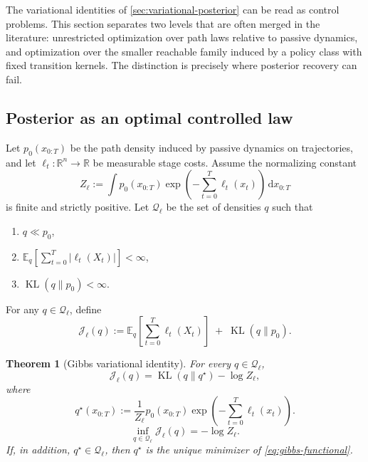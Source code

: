\documentclass[11pt]{article}
\newcommand{\R}{\mathbb{R}}
\newcommand{\E}{\mathbb{E}}
\newcommand{\KL}{\operatorname{KL}}
\newcommand{\dd}{\,\mathrm d}
\newcommand{\xtraj}{x_{0:T}}
\newcommand{\abs}[1]{\left\lvert #1 \right\rvert}
\newcommand{\bracks}[1]{\left[ #1 \right]}
\newcommand{\mc}{\mathcal}
\numberwithin{equation}{section}
\theoremstyle{plain}
\newtheorem{theorem}{Theorem}[section]
\theoremstyle{definition}
\theoremstyle{remark}
\begin{document}
The variational identities of \cref{sec:variational-posterior} can be read as control problems. This section separates two levels that are often merged in the literature: unrestricted optimization over path laws relative to passive dynamics, and optimization over the smaller reachable family induced by a policy class with fixed transition kernels. The distinction is precisely where posterior recovery can fail.

\subsection{Posterior as an optimal controlled law}

Let $p_0(\xtraj)$ be the path density induced by passive dynamics on trajectories, and let $\ell_t:\R^n\to\R$ be measurable stage costs. Assume the normalizing constant
\begin{equation}
Z_\ell := \int p_0(\xtraj)\exp\!\left(-\sum_{t=0}^{T}\ell_t(x_t)\right)\dd \xtraj
\end{equation}
is finite and strictly positive. Let $\mc Q_\ell$ be the set of densities $q$ such that
\begin{enumerate}[label=\roman*.]
\item $q\ll p_0$,
\item $\E_q\!\bracks{\sum_{t=0}^{T}\abs{\ell_t(X_t)}}<\infty$,
\item $\KL(q\|p_0)<\infty$.
\end{enumerate}
For any $q\in\mc Q_\ell$, define
\begin{equation}
\mc J_{\ell}(q)
:=
\E_q\!\bracks{\sum_{t=0}^{T}\ell_t(X_t)}
\;+\;
\KL(q\|p_0).
\label{eq:gibbs-functional}
\end{equation}

\begin{theorem}[Gibbs variational identity]
\label{thm:gibbs-control}
For every $q\in\mc Q_\ell$,
\begin{equation}
\mc J_{\ell}(q)
=
\KL(q\|q^\star)-\log Z_\ell,
\label{eq:gibbs-identity}
\end{equation}
where
\begin{equation}
q^\star(\xtraj)
:=
\frac{1}{Z_\ell}
p_0(\xtraj)\exp\!\left(-\sum_{t=0}^{T}\ell_t(x_t)\right).
\label{eq:gibbs-law}
\end{equation}
\begin{equation}
\inf_{q\in\mc Q_\ell}\mc J_{\ell}(q)
=
-\log Z_\ell.
\label{eq:gibbs-infimum}
\end{equation}
If, in addition, $q^\star\in\mc Q_\ell$, then $q^\star$ is the unique minimizer of \cref{eq:gibbs-functional}.
\end{theorem}
\end{document}
